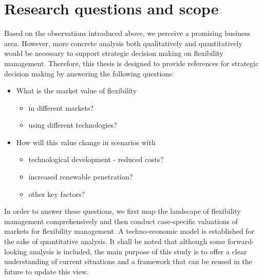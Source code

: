 
\section{Research questions and scope}

Based on the observations introduced above, we perceive a promising business area. However, more concrete analysis both qualitatively and quantitatively would be necessary to support strategic decision making on flexibility management. Therefore, this thesis is designed to provide references for strategic decision making by answering the following questions:

\begin{itemize}
	\item What is the market value of flexibility
	\begin{itemize}
		\item in different markets?
		\item using different technologies?
	\end{itemize}
	\item How will this value change in scenarios with
	\begin{itemize}
		\item technological development - reduced costs?
		\item increased renewable penetration?
		\item other key factors?
	\end{itemize}
\end{itemize}

In order to answer these questions, we first map the landscape of flexibility management comprehensively and then conduct case-specific valuations of markets for flexibility management. A techno-economic model is established for the sake of quantitative analysis. It shall be noted that although some forward-looking analysis is included, the main purpose of this study is to offer a clear understanding of current situations and a framework that can be reused in the future to update this view.

